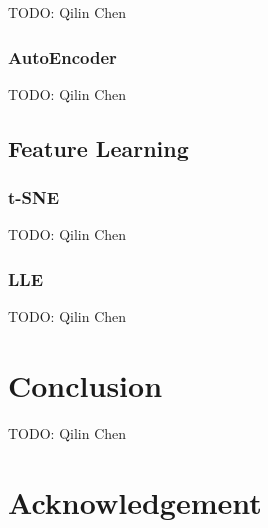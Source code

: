 \documentclass{article}
\begin{document}
TODO: Qilin Chen\\
\subsubsection{AutoEncoder}
TODO: Qilin Chen\\

\subsection{Feature Learning}
\subsubsection{t-SNE}
TODO: Qilin Chen\\
\subsubsection{LLE}
TODO: Qilin Chen\\

\section{Conclusion}
TODO: Qilin Chen\\
\section*{Acknowledgement}


\end{document}
